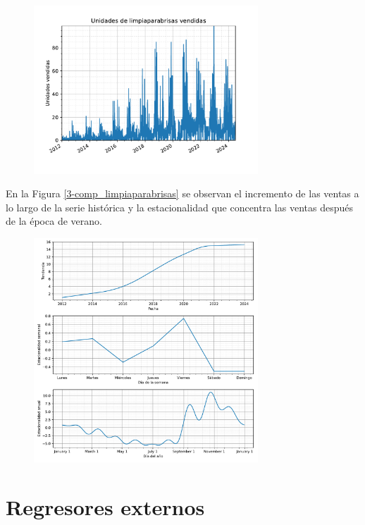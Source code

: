 \begin{figure}[H]
	{\includegraphics[width=0.75\textwidth]{imagenes/grafica_limpiaparabrisas.pdf}}
\end{figure}

En la Figura \ref*{3-comp_limpiaparabrisas} se observan el incremento de las ventas a lo largo de la serie histórica y la estacionalidad que concentra las ventas después de la época de verano.

\begin{figure}[H]
	{\includegraphics[width=0.75\textwidth]{imagenes/comps_limpiaparabrisas.pdf}}
\end{figure}


\section{Regresores externos}

